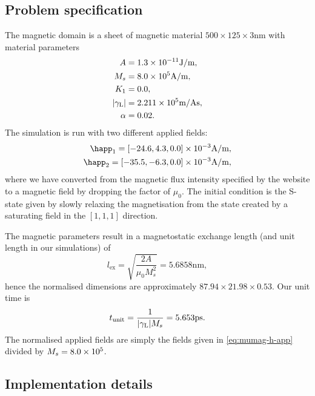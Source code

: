 \subsection{Problem specification}

The magnetic domain is a sheet of magnetic material $500 \times 125 \times 3$nm with material parameters
\begin{equation}
  \begin{aligned}
    A &= 1.3\times 10^{-11} \text{J/m}, \\
    M_s &= 8.0\times 10^{5} \text{A/m}, \\
    K_1 &= 0.0, \\
    {\left|{\gamma_{\mathrm{\tiny{L}}}} \right|} &= 2.211 \times 10^{5} \text{m/As}, \\
    \alpha &= 0.02.
  \end{aligned}
\end{equation}
The simulation is run with two different applied fields:
\begin{equation}
  \begin{aligned}
    \happ_1 = [-24.6, 4.3, 0.0] \E{-3}\text{A/m}, \\
    \happ_2 = [-35.5, -6.3, 0.0] \E{-3}\text{A/m}, \\
  \end{aligned}
  \label{eq:mumag-h-app}
\end{equation}
where we have converted from the magnetic flux intensity specified by the \mumag website to a magnetic field by dropping the factor of $\mu_0$.
The initial condition is the S-state given by slowly relaxing the magnetisation from the state created by a saturating field in the $[1,1,1]$ direction.

The magnetic parameters result in a magnetostatic exchange length (and unit length in our simulations) of
\begin{equation}
  l_{\text{ex}} = \sqrt{\frac{2A}{\mu_0 M_s^2}} = 5.6858\text{nm},
\end{equation}
hence the normalised dimensions are approximately $87.94 \times 21.98 \times 0.53$.
Our unit time is
\begin{equation}
  t_{\text{unit}} = \frac{1}{{\left|{\gamma_{\mathrm{\tiny{L}}}} \right|} M_s} = 5.653\text{ps}.
\end{equation}
The normalised applied fields are simply the fields given in \cref{eq:mumag-h-app} divided by $M_s = 8.0\times 10^{5}$.


\subsection{Implementation details}

